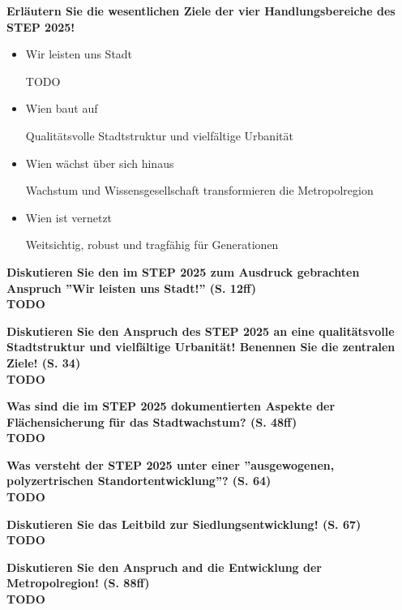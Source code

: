 \documentclass[]{article}
\newenvironment{question}{\vspace{8mm}\noindent\bfseries}{\\}
\begin{document}
\begin{question}
	Erläutern Sie die wesentlichen Ziele der vier Handlungsbereiche des STEP 2025!
\end{question}
\begin{itemize}
	\item Wir leisten uns Stadt
	
	TODO
	
	\item Wien baut auf
	
	Qualitätsvolle Stadtstruktur und vielfältige Urbanität
	
	\item Wien wächst über sich hinaus
	
	Wachstum und Wissensgesellschaft transformieren die Metropolregion
	
	\item Wien ist vernetzt
	
	Weitsichtig, robust und tragfähig für Generationen
\end{itemize}

\begin{question}
	Diskutieren Sie den im STEP 2025 zum Ausdruck gebrachten Anspruch ''Wir leisten uns Stadt!'' (S. 12ff)
\end{question}
TODO

\begin{question}
	Diskutieren Sie den Anspruch des STEP 2025 an eine qualitätsvolle Stadtstruktur und vielfältige Urbanität! Benennen Sie die zentralen Ziele! (S. 34)
\end{question}
TODO

\begin{question}
	Was sind die im STEP 2025 dokumentierten Aspekte der Flächensicherung für das Stadtwachstum? (S. 48ff)
\end{question}
TODO

\begin{question}
	Was versteht der STEP 2025 unter einer ''ausgewogenen, polyzertrischen Standortentwicklung''? (S. 64)
\end{question}
TODO

\begin{question}
	Diskutieren Sie das Leitbild zur Siedlungsentwicklung! (S. 67)
\end{question}
TODO

\begin{question}
	Diskutieren Sie den Anspruch and die Entwicklung der Metropolregion! (S. 88ff)
\end{question}
TODO
\end{document}
